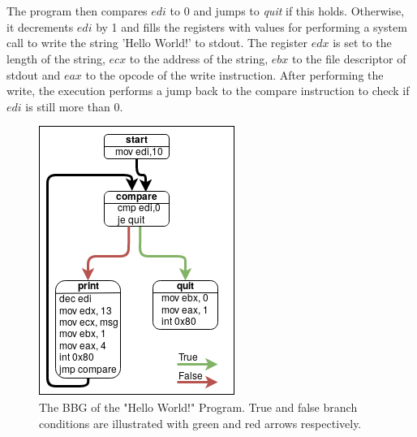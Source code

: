 \documentclass{kththesis}
\renewcommand{\it}[1]{\textit{#1}}
\begin{document}
\\ \\
The program then compares $edi$ to 0 and jumps to \it{quit} if this holds. Otherwise, it decrements $edi$ by 1 and fills the registers with values for performing a system call to write the string 'Hello World!' to stdout. The register $edx$ is set to the length of the string, $ecx$ to the address of the string, $ebx$ to the file descriptor of stdout and $eax$ to the opcode of the write instruction. After performing the write, the execution performs a jump back to the compare instruction to check if $edi$ is still more than 0.
\begin{figure}[!t]
    \centering
    \includegraphics[scale=0.6]{Images/BBGExample.png}
    \caption[The BBG of the "Hello World!" Program.]{The BBG of the "Hello World!" Program. True and false branch conditions are illustrated with green and red arrows respectively.}
    \label{fig:HelloBBG}
\end{figure}
\noindent
\end{document}
